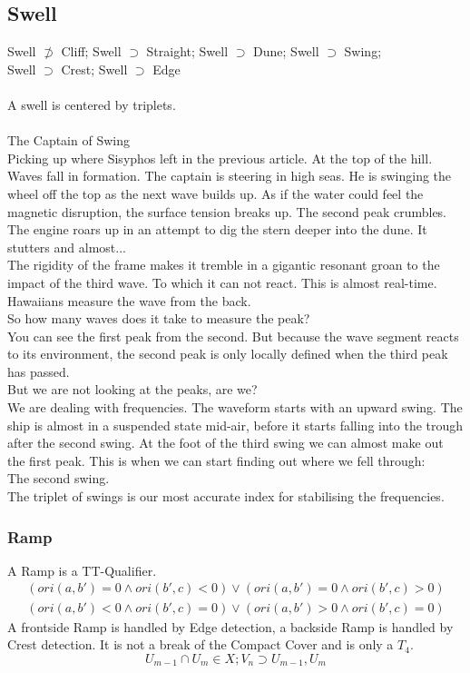 \documentclass{report}
\begin{document}
\subsection{Swell}
Swell $\not\supset$ Cliff; Swell $\supset$ Straight; Swell $\supset$ Dune; Swell $\supset$ Swing;\\ Swell $\supset$ Crest; Swell $\supset$ Edge\\\\
A swell is centered by triplets.\\\\
The Captain of Swing\\
Picking up where Sisyphos left in the previous article. At the top of the hill. Waves fall in formation. The captain is steering in high seas. He is swinging the wheel off the top as the next wave builds up. As if the water could feel the magnetic disruption, the surface tension breaks up. The second peak crumbles. The engine roars up in an attempt to dig the stern deeper into the dune. It stutters and almost...\\
The rigidity of the frame makes it tremble in a gigantic resonant groan to the impact of the third wave. To which it can not react. This is almost real-time. Hawaiians measure the wave from the back.\\
So how many waves does it take to measure the peak?\\
You can see the first peak from the second. But because the wave segment reacts to its environment, the second peak is only locally defined when the third peak has passed.\\
But we are not looking at the peaks, are we?\\
We are dealing with frequencies. The waveform starts with an upward swing. The ship is almost in a suspended state mid-air, before it starts falling into the trough after the second swing. At the foot of the third swing we can almost make out the first peak. This is when we can start finding out where we fell through:\\
The second swing.\\
The triplet of swings is our most accurate index for stabilising the frequencies.
\subsubsection{Ramp}
A Ramp is a TT-Qualifier.
\begin{align}
(ori(a,b')=0\land ori(b',c)<0)\lor (ori(a,b')=0\land ori(b',c)>0)\\
(ori(a,b')<0\land ori(b',c)=0)\lor (ori(a,b')>0\land ori(b',c)=0)
\end{align}
A frontside Ramp is handled by Edge detection, a backside Ramp is handled by Crest detection. It is not a break of the Compact Cover and is only a $T_{4}$.
\begin{equation}
U_{m-1}\cap U_{m}\in X; V_{n}\supset U_{m-1},U_{m}
\end{equation}
\end{document}
